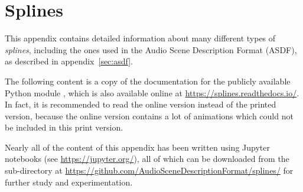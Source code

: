 \chapter{Splines}
\label{sec:splines}

This appendix contains detailed information
about many different types of \emph{splines},
including the ones used in the Audio Scene Description Format (ASDF),
as described in appendix~\ref{sec:asdf}.

The following content is a copy of the documentation for the
publicly available Python module ,
which is also available online at
\url{https://splines.readthedocs.io/}.
In fact, it is recommended to read the online version
instead of the printed version, because the online version contains
a lot of animations which could not be included in this print version.

Nearly all of the content of this appendix has been written using
Jupyter notebooks (see \url{https://jupyter.org/}),
all of which can be downloaded from the sub-directory  at
\url{https://github.com/AudioSceneDescriptionFormat/splines/}
for further study and experimentation.


